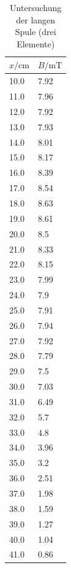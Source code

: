 \documentclass[11pt,ngerman,a4paper]{article}
\begin{document}
\begin{table}[H]
\centering
\begin{tabular}{ll}
\toprule
{$x / \si{\centi\meter}$} &{ $B/\si{\milli\tesla}$ }\\
\midrule
10.0 & 7.92\\
11.0 & 7.96\\
12.0 & 7.92\\
13.0 & 7.93\\
14.0 & 8.01\\
15.0 & 8.17\\
16.0 & 8.39\\
17.0 & 8.54\\
18.0 & 8.63\\
19.0 & 8.61\\
20.0 & 8.5\\
21.0 & 8.33\\
22.0 & 8.15\\
23.0 & 7.99\\
24.0 & 7.9\\
25.0 & 7.91\\
26.0 & 7.94\\
27.0 & 7.92\\
28.0 & 7.79\\
29.0 & 7.5\\
30.0 & 7.03\\
31.0 & 6.49\\
32.0 & 5.7\\
33.0 & 4.8\\
34.0 & 3.96\\
35.0 & 3.2\\
36.0 & 2.51\\
37.0 & 1.98\\
38.0 & 1.59\\
39.0 & 1.27\\
40.0 & 1.04\\
41.0 & 0.86\\
\bottomrule
\end{tabular}
\label{}
\caption{Untersuchung der langen Spule (drei Elemente)}
\end{table}
\end{document}
